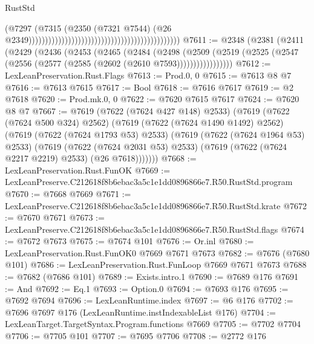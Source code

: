 \begin{lexlean}{RustStd}
\begin{coremodule}
                                                                                        (@7297
                                                                                          (@7315
                                                                                            (@2350
                                                                                              (@7321
                                                                                                @7544)
                                                                                              (@26
                                                                                                @2349))))))))))))))))))))))))))))))))))))))))))))))
@7611 := @2348
    (@2381
      (@2411
        (@2429
          (@2436
            (@2453
              (@2465
                (@2484
                  (@2498
                    (@2509
                      (@2519 (@2525 (@2547 (@2556 (@2577 (@2585 (@2602 (@2610 @7593)))))))))))))))))
@7612 := LexLeanPreservation.Rust.Flags
@7613 := Prod.{0, 0}
@7615 := @7613 @8 @7
@7616 := @7613 @7615
@7617 := Bool
@7618 := @7616 @7617
@7619 := @2 @7618
@7620 := Prod.mk.{0, 0}
@7622 := @7620 @7615 @7617
@7624 := @7620 @8 @7
@7667 := @7619
    (@7622 (@7624 @427 @148) @2533)
    (@7619
      (@7622 (@7624 @500 @324) @2562)
      (@7619
        (@7622 (@7624 @1490 @1492) @2562)
        (@7619
          (@7622 (@7624 @1793 @53) @2533)
          (@7619
            (@7622 (@7624 @1964 @53) @2533)
            (@7619
              (@7622 (@7624 @2031 @53) @2533)
              (@7619 (@7622 (@7624 @2217 @2219) @2533) (@26 @7618)))))))
@7668 := LexLeanPreservation.Rust.FunOK
@7669 := LexLeanPreserve.C212618f8b6ebac3a5c1e1dd0896866e7.R50.RustStd.program
@7670 := @7668 @7669
@7671 := LexLeanPreserve.C212618f8b6ebac3a5c1e1dd0896866e7.R50.RustStd.krate
@7672 := @7670 @7671
@7673 := LexLeanPreserve.C212618f8b6ebac3a5c1e1dd0896866e7.R50.RustStd.flags
@7674 := @7672 @7673
@7675 := @7674 @101
@7676 := Or.inl
@7680 := LexLeanPreservation.Rust.FunOK0 @7669 @7671 @7673
@7682 := @7676 (@7680 @101)
@7686 := LexLeanPreservation.Rust.FunLoop @7669 @7671 @7673
@7688 := @7682 (@7686 @101)
@7689 := Exists.intro.{1}
@7690 := @7689 @176
@7691 := And
@7692 := Eq.{1}
@7693 := Option.{0}
@7694 := @7693 @176
@7695 := @7692 @7694
@7696 := LexLeanRuntime.index
@7697 := @6 @176
@7702 := @7696 @7697 @176 (LexLeanRuntime.instIndexableList @176)
@7704 := LexLeanTarget.TargetSyntax.Program.functions @7669
@7705 := @7702 @7704
@7706 := @7705 @101
@7707 := @7695 @7706
@7708 := @2772 @176

\end{coremodule}
\end{lexlean}
